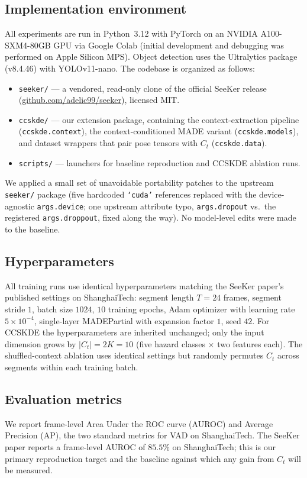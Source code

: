 \documentclass{article}
\begin{document}
\subsection{Implementation environment}
All experiments are run in Python~3.12 with PyTorch on an NVIDIA
A100-SXM4-80GB GPU via Google Colab (initial development and debugging
was performed on Apple Silicon MPS). Object detection uses the
Ultralytics package (v8.4.46) with YOLOv11-nano. The codebase is organized
as follows:

\begin{itemize}
    \item \texttt{seeker/} --- a vendored, read-only clone of the official
    SeeKer release~\citep{delic2025seeker} (\url{github.com/adelic99/seeker}),
    licensed MIT.
    \item \texttt{ccskde/} --- our extension package, containing the
    context-extraction pipeline (\texttt{ccskde.context}), the
    context-conditioned MADE variant (\texttt{ccskde.models}), and dataset
    wrappers that pair pose tensors with $C_t$ (\texttt{ccskde.data}).
    \item \texttt{scripts/} --- launchers for baseline reproduction and
    CCSKDE ablation runs.
\end{itemize}

We applied a small set of unavoidable portability patches to the upstream
\texttt{seeker/} package (five hardcoded \texttt{`cuda'} references replaced
with the device-agnostic \texttt{args.device}; one upstream attribute typo,
\texttt{args.dropout} vs.\ the registered \texttt{args.droppout}, fixed
along the way). No model-level edits were made to the baseline.

\subsection{Hyperparameters}
All training runs use identical hyperparameters matching the SeeKer
paper's published settings on ShanghaiTech: segment length $T=24$
frames, segment stride $1$, batch size $1024$, $10$ training epochs,
Adam optimizer with learning rate $5\times10^{-4}$, single-layer
MADEPartial with expansion factor $1$, seed $42$. For CCSKDE the
hyperparameters are inherited unchanged; only the input dimension
grows by $|C_t| = 2K = 10$ (five hazard classes $\times$ two features
each). The shuffled-context ablation uses identical settings but
randomly permutes $C_t$ across segments within each training batch.

\subsection{Evaluation metrics}
We report frame-level Area Under the ROC curve (AUROC) and Average
Precision (AP), the two standard metrics for VAD on ShanghaiTech. The
SeeKer paper reports a frame-level AUROC of $85.5\%$ on ShanghaiTech;
this is our primary reproduction target and the baseline against which any
gain from $C_t$ will be measured.
\end{document}
